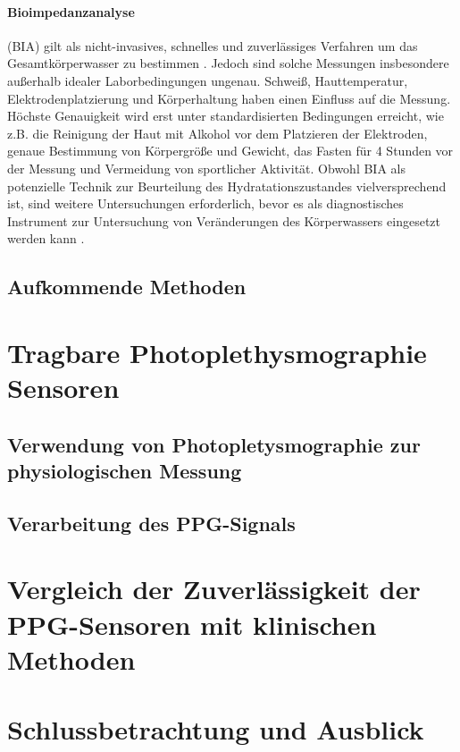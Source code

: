 \documentclass[10pt,a4paper,headinclude,twoside, plainheadsepline, open=right, numbers=noenddot, twocolumn]{article}
\begin{document}
\paragraph{Bioimpedanzanalyse} (BIA) gilt als nicht-invasives, schnelles und zuverlässiges Verfahren um das Gesamtkörperwasser zu bestimmen \cite{kavouras2002assessing}.
Jedoch sind solche Messungen insbesondere außerhalb idealer Laborbedingungen ungenau.
Schweiß, Hauttemperatur, Elektrodenplatzierung und Körperhaltung haben einen Einfluss auf die Messung.
Höchste Genauigkeit wird erst unter standardisierten Bedingungen erreicht, wie z.B. die Reinigung der Haut mit Alkohol vor dem Platzieren der Elektroden, genaue Bestimmung von Körpergröße und Gewicht, das Fasten für 4 Stunden vor der Messung und Vermeidung von sportlicher Aktivität. 
Obwohl BIA als potenzielle Technik zur Beurteilung des Hydratationszustandes vielversprechend ist, sind weitere Untersuchungen erforderlich, bevor es als diagnostisches Instrument zur Untersuchung von Veränderungen des Körperwassers eingesetzt werden kann \cite{garret2018engineering} \cite{kavouras2002assessing}.


\subsection{Aufkommende Methoden}
\label{aufkommende methoden}


\section{Tragbare Photoplethysmographie Sensoren}
\label{tragbare photoplethysmographie sensoren}


\subsection{Verwendung von Photopletysmographie zur physiologischen Messung}
\label{verwendung von photopletysmographie zur physiologischen messung}


\subsection{Verarbeitung des PPG-Signals}
\label{verarbeitung des ppg-signals}

\section{Vergleich der Zuverlässigkeit der PPG-Sensoren mit klinischen Methoden}
\label{vergleich der verfahren}

\section{Schlussbetrachtung und Ausblick}
\label{schlussbetrachtung und ausblick}


%
\printbibliography
\end{document}
